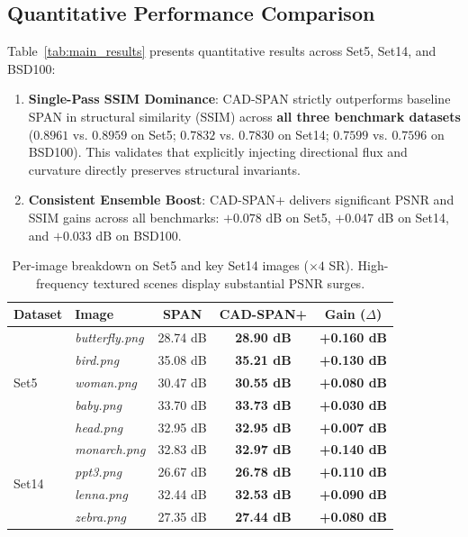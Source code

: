 \documentclass[conference]{IEEEtran}
\begin{document}
\subsection{Quantitative Performance Comparison}
Table~\ref{tab:main_results} presents quantitative results across Set5, Set14, and BSD100:
\begin{enumerate}
    \item \textbf{Single-Pass SSIM Dominance}: CAD-SPAN strictly outperforms baseline SPAN in structural similarity (SSIM) across \textbf{all three benchmark datasets} ($0.8961$ vs. $0.8959$ on Set5; $0.7832$ vs. $0.7830$ on Set14; $0.7599$ vs. $0.7596$ on BSD100). This validates that explicitly injecting directional flux and curvature directly preserves structural invariants.
    \item \textbf{Consistent Ensemble Boost}: CAD-SPAN+ delivers significant PSNR and SSIM gains across all benchmarks: $+0.078$ dB on Set5, $+0.047$ dB on Set14, and $+0.033$ dB on BSD100.
\end{enumerate}

\begin{table}[h]
\caption{Per-image breakdown on Set5 and key Set14 images ($\times 4$ SR). High-frequency textured scenes display substantial PSNR surges.}
\centering
\renewcommand{\arraystretch}{1.05}
\begin{tabular}{llccc}
\toprule
\textbf{Dataset} & \textbf{Image} & \textbf{SPAN} & \textbf{CAD-SPAN+} & \textbf{Gain ($\Delta$)} \\
\midrule
\multirow{5}{*}{Set5}
 & \textit{butterfly.png} & 28.74 dB & \textbf{28.90 dB} & \textbf{+0.160 dB} \\
 & \textit{bird.png}      & 35.08 dB & \textbf{35.21 dB} & \textbf{+0.130 dB} \\
 & \textit{woman.png}     & 30.47 dB & \textbf{30.55 dB} & \textbf{+0.080 dB} \\
 & \textit{baby.png}      & 33.70 dB & \textbf{33.73 dB} & \textbf{+0.030 dB} \\
 & \textit{head.png}      & 32.95 dB & \textbf{32.95 dB} & \textbf{+0.007 dB} \\
\midrule
\multirow{4}{*}{Set14}
 & \textit{monarch.png}   & 32.83 dB & \textbf{32.97 dB} & \textbf{+0.140 dB} \\
 & \textit{ppt3.png}      & 26.67 dB & \textbf{26.78 dB} & \textbf{+0.110 dB} \\
 & \textit{lenna.png}     & 32.44 dB & \textbf{32.53 dB} & \textbf{+0.090 dB} \\
 & \textit{zebra.png}     & 27.35 dB & \textbf{27.44 dB} & \textbf{+0.080 dB} \\
\bottomrule
\end{tabular}
\label{tab:per_image}
\end{table}
\end{document}
